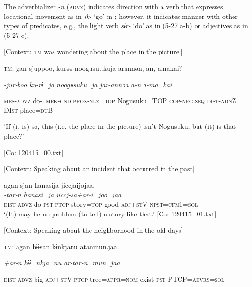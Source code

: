 The adverbializer \textit{{}-n} (\textsc{advz}) indicates direction with a verb that expresses locational movement as in \textit{ik-} ‘go’ in ; however, it indicates manner with other types of predicates, e.g., the light verb \textit{sɨr-} ‘do’ as in (5-27 a-b) or adjectives as in (5-27 c).

\ea \label{ex:5:27}  \ea \label{ex:5:27a} [Context: \textsc{tm} was wondering about the place in the picture.]

    \textsc{tm}:  gan  sjuppoo,  kurəə  noogusu..kuja   arannən,  an,  amakai?

      \textit{}  \textit{-jur-boo  ku-rɨ=ja  noogusuku=ja} \textit{jar-annən}  \textit{a-n}  \textit{a-ma=kai}
                                                                    
      \textsc{mes}-\textsc{advz}  do-\textsc{umrk}-\textsc{cnd}  \textsc{prox}-\textsc{nlz}=\textsc{top}  Nogusuku=TOP  \textsc{cop}-\textsc{neg}.\textsc{seq}  \textsc{dist}-\textsc{adn}Z  DI\textsc{st}-place=\textsc{du}B

      ‘If (it is) so, this (i.e. the place in the picture) isn’t Nogusuku, but (it) is that place?’

      [Co: 120415\_00.txt]

 \ex \label{ex:5:b} [Context: Speaking about an incident that occurred in the past]

\glll  agan  sjan  hanasija  jiccjaijojaa.\\
\textit{}  \textit{-tar-n  hanasi=ja  jiccj-sa+ar-i=joo=jaa}\\
\textsc{dist}-\textsc{advz}  do-\textsc{pst}-\textsc{ptcp}  story=\textsc{top}  good-\textsc{adj}+\textsc{st}V-\textsc{npst}=\textsc{cfm}1=\textsc{sol}\\
\glt ‘(It) may be no problem (to tell) a story like that.’ [Co: 120415\_01.txt]

 \ex \label{ex:5:c} [Context: Speaking about the neighborhood in the old days]

    \textsc{tm}:  agan  hɨɨsan  kɨnkjanu   atanmun.jaa.

      \textit{}  \textit{+ar-n}  \textit{kɨɨ=nkja=nu}   \textit{ar-tar-n=mun=jaa}
                                                                  
      \textsc{dist}-\textsc{advz}  big-\textsc{adj}+\textsc{st}V-\textsc{ptcp}  tree=\textsc{appr}=\textsc{nom} exist-\textsc{pst}-PTCP=\textsc{advrs}=\textsc{sol}

